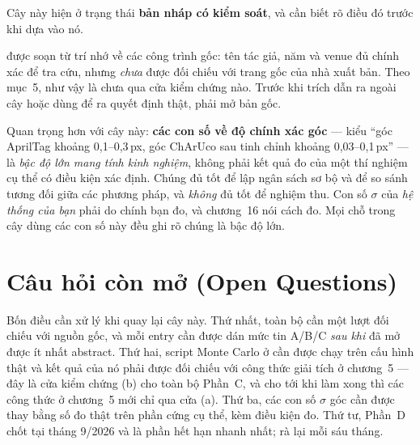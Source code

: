 \documentclass[marker.tex]{subfiles}
\begin{document}
\begin{cambay}
Cây này hiện ở trạng thái \textbf{bản nháp có kiểm soát}, và cần biết rõ điều đó trước khi dựa vào nó.

 được soạn từ trí nhớ về các công trình gốc: tên tác giả, năm và venue đủ chính xác để tra cứu, nhưng \emph{chưa} được đối chiếu với trang gốc của nhà xuất bản. Theo  mục~5, như vậy là chưa qua cửa kiểm chứng nào. Trước khi trích dẫn ra ngoài cây hoặc dùng để ra quyết định thật, phải mở bản gốc.

Quan trọng hơn với cây này: \textbf{các con số về độ chính xác góc} --- kiểu ``góc AprilTag khoảng 0,1--0,3\,px, góc ChArUco sau tinh chỉnh khoảng 0,03--0,1\,px'' --- là \emph{bậc độ lớn mang tính kinh nghiệm}, không phải kết quả đo của một thí nghiệm cụ thể có điều kiện xác định. Chúng đủ tốt để lập ngân sách sơ bộ và để so sánh tương đối giữa các phương pháp, và \emph{không} đủ tốt để nghiệm thu. Con số \(\sigma\) của \emph{hệ thống của bạn} phải do chính bạn đo, và chương~16 nói cách đo. Mọi chỗ trong cây dùng các con số này đều ghi rõ chúng là bậc độ lớn.
\end{cambay}

\section*{Câu hỏi còn mở (Open Questions)}

Bốn điều cần xử lý khi quay lại cây này. Thứ nhất, toàn bộ  cần một lượt đối chiếu với nguồn gốc, và mỗi entry cần được dán mức tin A/B/C \emph{sau khi} đã mở được ít nhất abstract. Thứ hai, script Monte Carlo ở  cần được chạy trên cấu hình thật và kết quả của nó phải được đối chiếu với công thức giải tích ở chương~5 --- đây là cửa kiểm chứng (b) cho toàn bộ Phần~C, và cho tới khi làm xong thì các công thức ở chương~5 mới chỉ qua cửa (a). Thứ ba, các con số \(\sigma\) góc cần được thay bằng số đo thật trên phần cứng cụ thể, kèm điều kiện đo. Thứ tư, Phần~D chốt tại tháng 9/2026 và là phần hết hạn nhanh nhất; rà lại mỗi sáu tháng.
\end{document}
